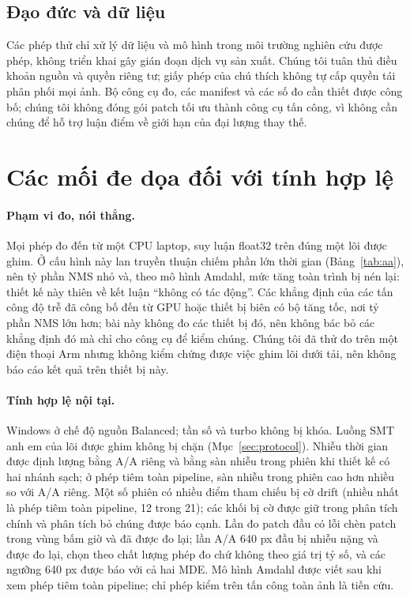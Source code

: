 \documentclass[a4paper,fleqn]{cas-dc}
\begin{document}
\subsection{Đạo đức và dữ liệu}
Các phép thử chỉ xử lý dữ liệu và mô hình trong môi trường nghiên cứu được phép, không triển khai gây gián đoạn dịch vụ sản xuất. Chúng tôi tuân thủ điều khoản nguồn và quyền riêng tư; giấy phép của chú thích không tự cấp quyền tái phân phối mọi ảnh. Bộ công cụ đo, các manifest và các số đo cần thiết được công bố; chúng tôi không đóng gói patch tối ưu thành công cụ tấn công, vì không cần chúng để hỗ trợ luận điểm về giới hạn của đại lượng thay thế.

\section{Các mối đe dọa đối với tính hợp lệ}
\label{sec:threats}
\paragraph{Phạm vi đo, nói thẳng.}
Mọi phép đo đến từ một CPU laptop, suy luận float32 trên đúng một lõi được ghim. Ở cấu hình này lan truyền thuận chiếm phần lớn thời gian (Bảng~\ref{tab:aa}), nên tỷ phần NMS nhỏ và, theo mô hình Amdahl, mức tăng toàn trình bị nén lại: thiết kế này thiên về kết luận ``không có tác động''. Các khẳng định của các tấn công độ trễ đã công bố đến từ GPU hoặc thiết bị biên có bộ tăng tốc, nơi tỷ phần NMS lớn hơn; bài này không đo các thiết bị đó, nên không bác bỏ các khẳng định đó mà chỉ cho công cụ để kiểm chúng. Chúng tôi đã thử đo trên một điện thoại Arm nhưng không kiểm chứng được việc ghim lõi dưới tải, nên không báo cáo kết quả trên thiết bị này.
\paragraph{Tính hợp lệ nội tại.}
Windows ở chế độ nguồn Balanced; tần số và turbo không bị khóa. Luồng SMT anh em của lõi được ghim không bị chặn (Mục~\ref{sec:protocol}). Nhiễu thời gian được định lượng bằng A/A riêng và bằng sàn nhiễu trong phiên khi thiết kế có hai nhánh sạch; ở phép tiêm toàn pipeline, sàn nhiễu trong phiên cao hơn nhiều so với A/A riêng. Một số phiên có nhiều điểm tham chiếu bị cờ drift (nhiều nhất là phép tiêm toàn pipeline, 12 trong 21); các khối bị cờ được giữ trong phân tích chính và phân tích bỏ chúng được báo cạnh. Lần đo patch đầu có lỗi chèn patch trong vùng bấm giờ và đã được đo lại; lần A/A 640 px đầu bị nhiễu nặng và được đo lại, chọn theo chất lượng phép đo chứ không theo giá trị tỷ số, và các ngưỡng 640 px được báo với cả hai MDE. Mô hình Amdahl được viết sau khi xem phép tiêm toàn pipeline; chỉ phép kiểm trên tấn công toàn ảnh là tiến cứu.
\end{document}
